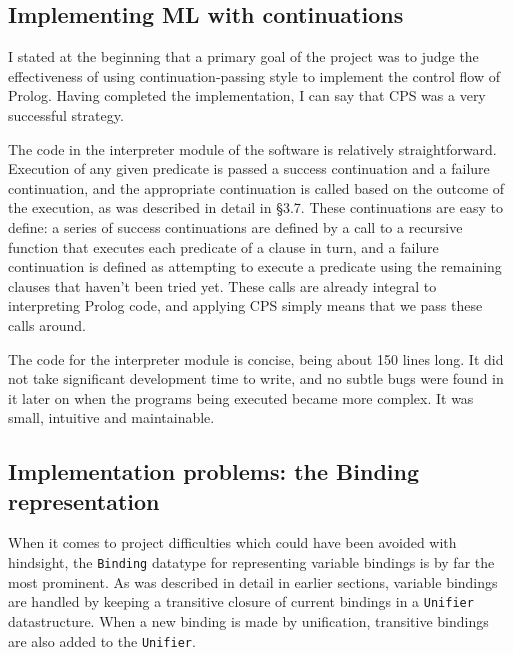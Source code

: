 \documentclass[12pt]{article}
\begin{document}



\subsection{Implementing ML with continuations}

I stated at the beginning that a primary goal of the project was to judge the effectiveness of using continuation-passing style to implement the control flow of Prolog. 
Having completed the implementation, I can say that CPS was a very successful strategy.

The code in the interpreter module of the software is relatively straightforward. 
Execution of any given predicate is passed a success continuation and a failure continuation, and the appropriate continuation is called based on the outcome of the execution, as was described in detail in \S3.7. 
These continuations are easy to define: a series of success continuations are defined by a call to a recursive function that executes each predicate of a clause in turn, and a failure continuation is defined as attempting to execute a predicate using the remaining clauses that haven't been tried yet. 
These calls are already integral to interpreting Prolog code, and applying CPS simply means that we pass these calls around.

The code for the interpreter module is concise, being about 150 lines long. 
It did not take significant development time to write, and no subtle bugs were found in it later on when the programs being executed became more complex. 
It was small, intuitive and maintainable.

\subsection{Implementation problems: the Binding representation}

When it comes to project difficulties which could have been avoided with hindsight, the \verb|Binding| datatype for representing variable bindings is by far the most prominent. 
As was described in detail in earlier sections, variable bindings are handled by keeping a transitive closure of current bindings in a \verb|Unifier| datastructure. 
When a new binding is made by unification, transitive bindings are also added to the \verb|Unifier|.
\end{document}
